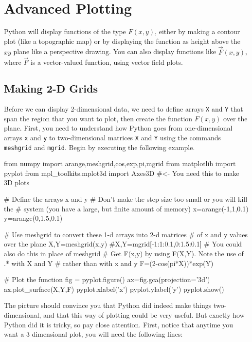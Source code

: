 \chapter{Advanced Plotting}
\label{chap:advancedplots}


Python will display functions of the type $F(x,y)$, either by
making a contour plot (like a topographic map) or by displaying the
function as height above the $xy$ plane like a perspective drawing.
You can also display functions like $\vec{F}(x,y)$, where $\vec{F}$
is a vector-valued function, using vector field plots.

\medskip

\section{Making 2-D Grids}

Before we can display 2-dimensional data, we need to define arrays
{\tt X} and {\tt Y} that span the region that you want to plot, then create
the function $F(x,y)$ over the plane.  First, you need to understand
how Python goes from
one-dimensional arrays \texttt{x} and \texttt{y} to two-dimensional
matrices \texttt{X} and \texttt{Y} using the commands {\tt
meshgrid} and {\tt mgrid}. Begin by executing the following
example.
\begin{codeexample}
\begin{VerbatimOut}{\listingFile}
from numpy import arange,meshgrid,cos,exp,pi,mgrid
from matplotlib import pyplot
from mpl_toolkits.mplot3d import Axes3D  #<- You need this to make 3D plots

# Define the arrays x and y
# Don't make the step size too small or you will kill the
# system (you have a large, but finite amount of memory)
x=arange(-1,1,0.1)
y=arange(0,1.5,0.1)

# Use meshgrid to convert these 1-d arrays into 2-d matrices
# of x and y values over the plane
X,Y=meshgrid(x,y)
#X,Y=mgrid[-1:1:0.1,0:1.5:0.1]  # You could also do this in place of meshgrid
# Get F(x,y) by using F(X,Y). Note the use of .* with X and Y
# rather than with x and y
F=(2-cos(pi*X))*exp(Y)

# Plot the function
fig = pyplot.figure()
ax=fig.gca(projection='3d')
ax.plot_surface(X,Y,F)
pyplot.xlabel('x')
pyplot.ylabel('y')
pyplot.show()
\end{VerbatimOut}
\end{codeexample}
The picture should convince you that Python did indeed make
things two-dimensional, and that this way of plotting could be very
useful. But exactly how Python did it is tricky, so pay close
attention.  First, notice that anytime you want a 3 dimensional plot,
you will need the following lines:

